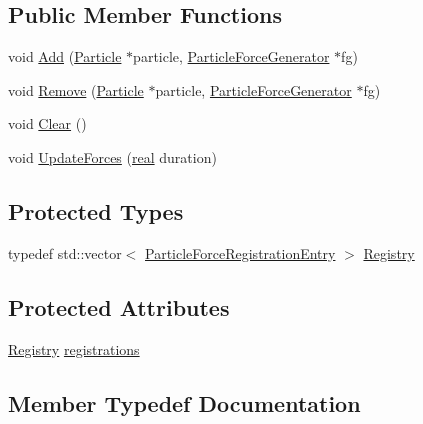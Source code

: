 \subsection*{Public Member Functions}
\begin{DoxyCompactItemize}
\item 
void \hyperlink{classrum_1_1_particle_force_registry_a5465cbeb57e7f7d69a76d86650a96a1d}{Add} (\hyperlink{classrum_1_1_particle}{Particle} $\ast$particle, \hyperlink{classrum_1_1_particle_force_generator}{Particle\+Force\+Generator} $\ast$fg)
\item 
void \hyperlink{classrum_1_1_particle_force_registry_abe34dbb3647802fcf07160fcbd1ad04b}{Remove} (\hyperlink{classrum_1_1_particle}{Particle} $\ast$particle, \hyperlink{classrum_1_1_particle_force_generator}{Particle\+Force\+Generator} $\ast$fg)
\item 
void \hyperlink{classrum_1_1_particle_force_registry_a24e4af625395c40b5f50c7efaf5ee028}{Clear} ()
\item 
void \hyperlink{classrum_1_1_particle_force_registry_a079cef854e8840d8c2690e4c0af3c9fb}{Update\+Forces} (\hyperlink{namespacerum_a7e8cca23573d5eaead0f138cbaa4862c}{real} duration)
\end{DoxyCompactItemize}
\subsection*{Protected Types}
\begin{DoxyCompactItemize}
\item 
typedef std\+::vector$<$ \hyperlink{structrum_1_1_particle_force_registry_1_1_particle_force_registration_entry}{Particle\+Force\+Registration\+Entry} $>$ \hyperlink{classrum_1_1_particle_force_registry_a63b7b5a4c79dafe5b3658505c7ac1163}{Registry}
\end{DoxyCompactItemize}
\subsection*{Protected Attributes}
\begin{DoxyCompactItemize}
\item 
\hyperlink{classrum_1_1_particle_force_registry_a63b7b5a4c79dafe5b3658505c7ac1163}{Registry} \hyperlink{classrum_1_1_particle_force_registry_a3ddde857faa8f9c610cdfc119c152b01}{registrations}
\end{DoxyCompactItemize}


\subsection{Member Typedef Documentation}
\mbox{\label{classrum_1_1_particle_force_registry_a63b7b5a4c79dafe5b3658505c7ac1163}} 
